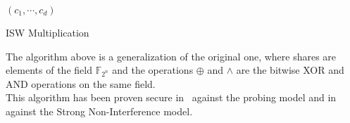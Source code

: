 \begin{algorithm}
    \SetAlgoLined
    \BlankLine
    \BlankLine


    \Return$(c_1, \cdots, c_d)$
    
    \caption{ISW Multiplication}
\end{algorithm}

The algorithm above is a generalization of the original one, where shares are elements of the field $\mathds{F}_{2^n}$ and the operations $\oplus$ and $\wedge$ are the bitwise XOR and AND operations on the same field.\\
This algorithm has been proven secure in~\cite{rivain2010provably} against the probing model and in~\cite{barthe2016strong} against the Strong Non-Interference model.


